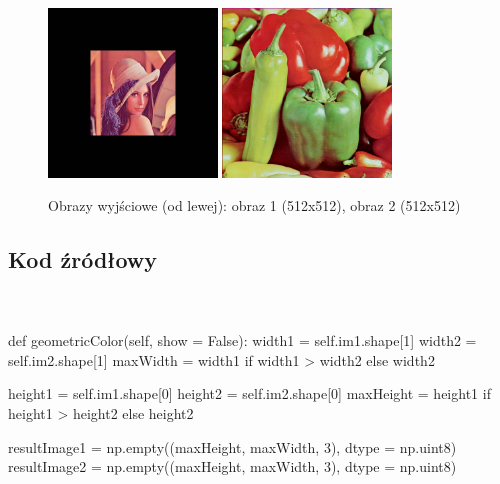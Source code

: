 \documentclass[final,a4paper,openany,12pt]{mwbk}
\begin{document}
\begin{figure}[H]
	\begin{center}
		\includegraphics[width=0.4\textwidth]{lena_color_unificationGeo_result}
		\includegraphics[width=0.4\textwidth]{peppers_color_unificationGeo_result}
	\end{center}
	\caption{Obrazy wyjściowe (od lewej): obraz 1 (512x512), obraz 2 (512x512)}
\end{figure}

\subsection*{Kod źródłowy}
\hfill
\\\\
\noindent def geometricColor(self, show = False): \newline
\indent width1 = self.im1.shape[1] \newline
\indent width2 = self.im2.shape[1] \newline
\indent maxWidth = width1 if width1 > width2 else width2 \newline

height1 = self.im1.shape[0] \newline
\indent height2 = self.im2.shape[0] \newline
\indent maxHeight = height1 if height1 > height2 else height2 \newline

resultImage1 = np.empty((maxHeight, maxWidth, 3), dtype = np.uint8) \newline
\indent resultImage2 = np.empty((maxHeight, maxWidth, 3), dtype = np.uint8) \newline
\end{document}
